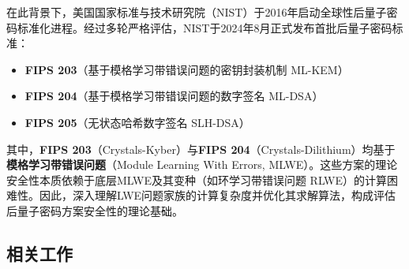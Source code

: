 \documentclass[12pt,a4paper]{article}
\numberwithin{equation}{section}
\begin{document}
在此背景下，美国国家标准与技术研究院（NIST）于2016年启动全球性后量子密码标准化进程。经过多轮严格评估，NIST于2024年8月正式发布首批后量子密码标准：
\begin{itemize}
    \item \textbf{FIPS 203}（基于模格学习带错误问题的密钥封装机制 ML-KEM）
    \item \textbf{FIPS 204}（基于模格学习带错误问题的数字签名 ML-DSA）
    \item \textbf{FIPS 205}（无状态哈希数字签名 SLH-DSA）
\end{itemize}
其中，\textbf{FIPS 203}（Crystals-Kyber）与\textbf{FIPS 204}（Crystals-Dilithium）均基于\textbf{模格学习带错误问题}（Module Learning With Errors, MLWE）。这些方案的理论安全性本质依赖于底层MLWE及其变种（如环学习带错误问题 RLWE）的计算困难性。因此，深入理解LWE问题家族的计算复杂度并优化其求解算法，构成评估后量子密码方案安全性的理论基础。

\subsection*{相关工作}

\end{document}
